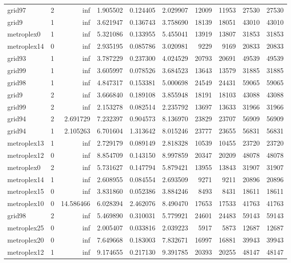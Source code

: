 \begin{longtable}{|l|r|r|r|r|r|r|r|r|r|}
grid97 & 2 & inf & 1.905502 & 0.124405 & 2.029907 & 12009 & 11953 & 27530 & 27530 \\
grid9 & 1 & inf & 3.621947 & 0.136743 & 3.758690 & 18139 & 18051 & 43010 & 43010 \\
metroplex0 & 1 & inf & 5.321086 & 0.133955 & 5.455041 & 13919 & 13807 & 31853 & 31853 \\
metroplex14 & 0 & inf & 2.935195 & 0.085786 & 3.020981 & 9229 & 9169 & 20833 & 20833 \\
grid93 & 1 & inf & 3.787229 & 0.237300 & 4.024529 & 20793 & 20691 & 49539 & 49539 \\
grid99 & 1 & inf & 3.605997 & 0.078526 & 3.684523 & 13643 & 13579 & 31885 & 31885 \\
grid98 & 1 & inf & 4.847317 & 0.153381 & 5.000698 & 24549 & 24431 & 59065 & 59065 \\
grid9 & 2 & inf & 3.666840 & 0.189108 & 3.855948 & 18191 & 18103 & 43088 & 43088 \\
grid99 & 2 & inf & 2.153278 & 0.082514 & 2.235792 & 13697 & 13633 & 31966 & 31966 \\
grid94 & 2 & 2.691729 & 7.232397 & 0.904573 & 8.136970 & 23829 & 23707 & 56909 & 56909 \\
grid94 & 1 & 2.105263 & 6.701604 & 1.313642 & 8.015246 & 23777 & 23655 & 56831 & 56831 \\
metroplex13 & 1 & inf & 2.729179 & 0.089149 & 2.818328 & 10539 & 10455 & 23720 & 23720 \\
metroplex12 & 0 & inf & 8.854709 & 0.143150 & 8.997859 & 20347 & 20209 & 48078 & 48078 \\
metroplex0 & 2 & inf & 5.731627 & 0.147794 & 5.879421 & 13955 & 13843 & 31907 & 31907 \\
metroplex14 & 1 & inf & 2.608955 & 0.084554 & 2.693509 & 9271 & 9211 & 20896 & 20896 \\
metroplex15 & 0 & inf & 3.831860 & 0.052386 & 3.884246 & 8493 & 8431 & 18611 & 18611 \\
metroplex10 & 0 & 14.586466 & 6.028394 & 2.462076 & 8.490470 & 17653 & 17533 & 41763 & 41763 \\
grid98 & 2 & inf & 5.469890 & 0.310031 & 5.779921 & 24601 & 24483 & 59143 & 59143 \\
metroplex25 & 0 & inf & 2.005407 & 0.033816 & 2.039223 & 5917 & 5873 & 12687 & 12687 \\
metroplex20 & 0 & inf & 7.649668 & 0.183003 & 7.832671 & 16997 & 16881 & 39943 & 39943 \\
metroplex12 & 1 & inf & 9.174655 & 0.217130 & 9.391785 & 20393 & 20255 & 48147 & 48147 \\

\end{longtable}
